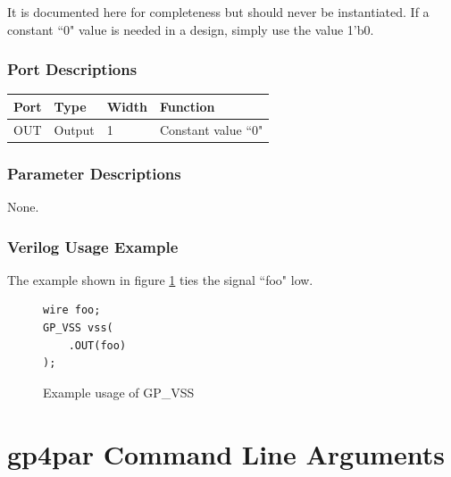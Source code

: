 \documentclass{article}
\begin{document}
It is documented here for completeness but should never be instantiated. If a constant ``0" value is needed in a 
design, simply use the value 1'b0.

\subsubsection{Port Descriptions}

\begin{tabularx}{4in}{|l|l|l|X|}
\hline
{\bfseries Port} & {\bfseries Type} & {\bfseries Width} & {\bfseries Function} \\
\hline
OUT & Output & 1 & Constant value ``0" \\
\hline
\end{tabularx}

\subsubsection{Parameter Descriptions}

None.

\subsubsection{Verilog Usage Example}

The example shown in figure \ref{gp-vss-example} ties the signal ``foo" low.

\begin{figure}[h]
\begin{lstlisting}
wire foo;
GP_VSS vss(
	.OUT(foo)
);
\end{lstlisting}
\caption{Example usage of GP\_VSS}
\label{gp-vss-example}
\end{figure}

\pagebreak
\section{gp4par Command Line Arguments}
\end{document}
